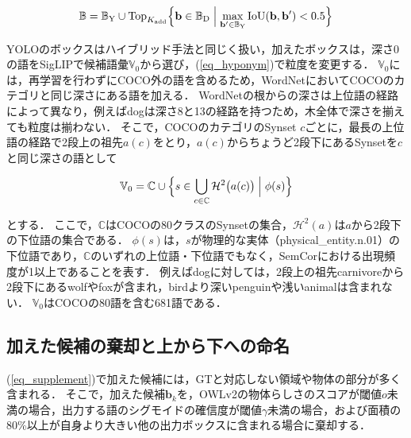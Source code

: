 \begin{equation}
    {\mathbb B} = {\mathbb B}_{\mathrm{Y}} \cup \mathrm{Top}_{K_{\mathrm{add}}} \Bigl\{ {\mathbf b} \in {\mathbb B}_{\mathrm{D}} \Bigm| \max_{{\mathbf b}' \in {\mathbb B}_{\mathrm{Y}}} \mathrm{IoU}({\mathbf b}, {\mathbf b}') < 0.5 \Bigr\}
    \label{eq_supplement}
\end{equation}

\noindent
YOLOのボックスはハイブリッド手法と同じく扱い，加えたボックスは，深さ0の語をSigLIPで候補語彙$ {\mathbb V}_0 $から選び，(\ref{eq_hyponym})で粒度を変更する．
$ {\mathbb V}_0 $には，再学習を行わずにCOCO外の語を含めるため，WordNetにおいてCOCOのカテゴリと同じ深さにある語を加える．
WordNetの根からの深さは上位語の経路によって異なり，例えばdogは深さ8と13の経路を持つため，木全体で深さを揃えても粒度は揃わない．
そこで，COCOのカテゴリのSynset $ c $ごとに，最長の上位語の経路で2段上の祖先$ a(c) $をとり，$ a(c) $からちょうど2段下にあるSynsetを$ c $と同じ深さの語として

\begin{equation}
    {\mathbb V}_0 = {\mathbb C} \cup \Bigl\{ s \in \bigcup_{c \in {\mathbb C}} {\mathcal H}^{2} \bigl( a(c) \bigr) \Bigm| \phi(s) \Bigr\}
    \label{eq_wordnet_vocab}
\end{equation}

\noindent
とする．
ここで，$ {\mathbb C} $はCOCOの80クラスのSynsetの集合，$ {\mathcal H}^{2}(a) $は$ a $から2段下の下位語の集合である．
$ \phi(s) $は，$ s $が物理的な実体（physical\_entity.n.01）の下位語であり，$ {\mathbb C} $のいずれの上位語・下位語でもなく，SemCor\cite{ref_SemCor}における出現頻度が1以上であることを表す．
例えばdogに対しては，2段上の祖先carnivoreから2段下にあるwolfやfoxが含まれ，birdより深いpenguinや浅いanimalは含まれない．
$ {\mathbb V}_0 $はCOCOの80語を含む681語である．

\begingroup
\color{red}
\subsection{加えた候補の棄却と上から下への命名}
(\ref{eq_supplement})で加えた候補には，GTと対応しない領域や物体の部分が多く含まれる．
そこで，加えた候補$ {\mathbf b}_k $を，OWLv2の物体らしさのスコアが閾値$ o $未満の場合，出力する語のシグモイドの確信度が閾値$ \gamma $未満の場合，および面積の80\%以上が自身より大きい他の出力ボックスに含まれる場合に棄却する．

